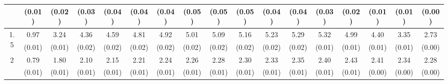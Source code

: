 \documentclass[12pt]{article}  %
\theoremstyle{plain}
\begin{document}
\begin{sidewaystable}[htbp]
\begin{tabular}{ccccccccccccccccc}
                       & (0.01)& (0.02)& (0.03)& (0.04)& (0.04)& (0.04)& (0.05)& (0.05)& (0.05)&  (0.04)&  (0.04)&  (0.03)&  (0.02)&  (0.01)&  (0.01) &   (0.00)\\ \hline                                                                                                                                                                                                                                                                                    
\multirow{2}{*}{1.5}  & 0.97& 3.24 & 4.36 & 4.59 &  4.81&   4.92  & 5.01  & 5.09 &  5.16 & 5.23 & 5.29 & 5.32 & 4.99 & 4.40 & 3.35 & 2.73\\
                      &  (0.01)& (0.01)& (0.02)& (0.02)& (0.02)& (0.02)& (0.02)& (0.02)& (0.02)&  (0.02)&  (0.02)&  (0.01)&  (0.01)&  (0.01)&  (0.01) &     (0.00)\\ \hline                                                                                                                                                                                                                                                                                    
\multirow{2}{*}{2}  &0.79& 1.80 & 2.10 & 2.15  & 2.21  & 2.24  & 2.26  & 2.28  & 2.30 & 2.33 & 2.35 & 2.40 & 2.43 & 2.41  &2.34 & 2.28\\
                      &  (0.01)& (0.01)& (0.01)& (0.01)& (0.01)& (0.01)& (0.01)& (0.01)& (0.01)&  (0.01)&  (0.01)&  (0.01)&  (0.01)&  (0.00)&  (0.00)  &     (0.00)\\ \hline                                                                                                                                                                                                                                                                                    
\end{tabular}
\end{sidewaystable}
\end{document}
